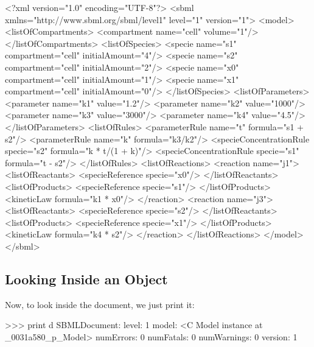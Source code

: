 \documentclass{sbmlmanual}
\begin{document}
\begin{boxedCodeVerbatim}
<?xml version="1.0" encoding="UTF-8"?>
<sbml xmlns="http://www.sbml.org/sbml/level1" level="1" version="1">
  <model>
    <listOfCompartments>
      <compartment name="cell" volume="1"/>
    </listOfCompartments>
    <listOfSpecies>
      <specie name="s1" compartment="cell" initialAmount="4"/>
      <specie name="s2" compartment="cell" initialAmount="2"/>
      <specie name="x0" compartment="cell" initialAmount="1"/>
      <specie name="x1" compartment="cell" initialAmount="0"/>
    </listOfSpecies>
    <listOfParameters>
      <parameter name="k1" value="1.2"/>
      <parameter name="k2" value="1000"/>
      <parameter name="k3" value="3000"/>
      <parameter name="k4" value="4.5"/>
    </listOfParameters>
    <listOfRules>
      <parameterRule name="t" formula="s1 + s2"/>
      <parameterRule name="k" formula="k3/k2"/>
      <specieConcentrationRule specie="s2" formula="k * t/(1 + k)"/>
      <specieConcentrationRule specie="s1" formula="t - s2"/>
    </listOfRules>
    <listOfReactions>
      <reaction name="j1">
        <listOfReactants>
          <specieReference specie="x0"/>
        </listOfReactants>
        <listOfProducts>
          <specieReference specie="s1"/>
        </listOfProducts>
        <kineticLaw formula="k1 * x0"/>
      </reaction>
      <reaction name="j3">
        <listOfReactants>
          <specieReference specie="s2"/>
        </listOfReactants>
        <listOfProducts>
          <specieReference specie="x1"/>
        </listOfProducts>
        <kineticLaw formula="k4 * s2"/>
      </reaction>
    </listOfReactions>
  </model>
</sbml>
\end{boxedCodeVerbatim}

\subsection{Looking Inside an  Object}
\label{sec:python-sbase}

Now, to look inside the document, we just print it:

\begin{shellVerbatim}
>>> print d
SBMLDocument:
   level:        1
   model:        <C Model instance at _0031a580_p_Model>
   numErrors:    0
   numFatals:    0
   numWarnings:  0
   version:      1
\end{shellVerbatim}
\end{document}
